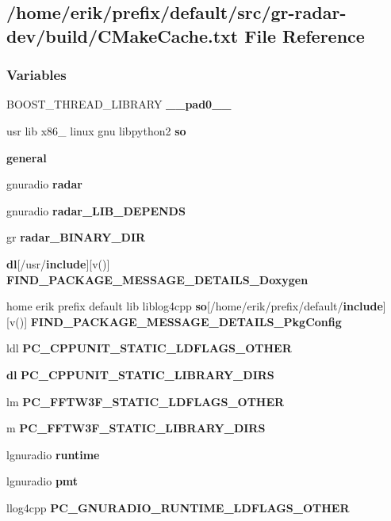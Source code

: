 \subsection{/home/erik/prefix/default/src/gr-\/radar-\/dev/build/\+C\+Make\+Cache.txt File Reference}
\label{gr-radar-dev_2build_2CMakeCache_8txt}
\subsubsection*{Variables}
\begin{DoxyCompactItemize}
\item 
B\+O\+O\+S\+T\+\_\+\+T\+H\+R\+E\+A\+D\+\_\+\+L\+I\+B\+R\+A\+RY {\bf \+\_\+\+\_\+pad0\+\_\+\+\_\+}
\item 
usr lib x86\+\_ linux gnu libpython2 {\bf so}
\item 
{\bf general}
\item 
gnuradio {\bf radar}
\item 
gnuradio {\bf radar\+\_\+\+L\+I\+B\+\_\+\+D\+E\+P\+E\+N\+DS}
\item 
gr {\bf radar\+\_\+\+B\+I\+N\+A\+R\+Y\+\_\+\+D\+IR}
\item 
{\bf dl}[/usr/{\bf include}][v()] {\bf F\+I\+N\+D\+\_\+\+P\+A\+C\+K\+A\+G\+E\+\_\+\+M\+E\+S\+S\+A\+G\+E\+\_\+\+D\+E\+T\+A\+I\+L\+S\+\_\+\+Doxygen}
\item 
home erik prefix default lib liblog4cpp {\bf so}[/home/erik/prefix/default/{\bf include}][v()] {\bf F\+I\+N\+D\+\_\+\+P\+A\+C\+K\+A\+G\+E\+\_\+\+M\+E\+S\+S\+A\+G\+E\+\_\+\+D\+E\+T\+A\+I\+L\+S\+\_\+\+Pkg\+Config}
\item 
ldl {\bf P\+C\+\_\+\+C\+P\+P\+U\+N\+I\+T\+\_\+\+S\+T\+A\+T\+I\+C\+\_\+\+L\+D\+F\+L\+A\+G\+S\+\_\+\+O\+T\+H\+ER}
\item 
{\bf dl} {\bf P\+C\+\_\+\+C\+P\+P\+U\+N\+I\+T\+\_\+\+S\+T\+A\+T\+I\+C\+\_\+\+L\+I\+B\+R\+A\+R\+Y\+\_\+\+D\+I\+RS}
\item 
lm {\bf P\+C\+\_\+\+F\+F\+T\+W3\+F\+\_\+\+S\+T\+A\+T\+I\+C\+\_\+\+L\+D\+F\+L\+A\+G\+S\+\_\+\+O\+T\+H\+ER}
\item 
m {\bf P\+C\+\_\+\+F\+F\+T\+W3\+F\+\_\+\+S\+T\+A\+T\+I\+C\+\_\+\+L\+I\+B\+R\+A\+R\+Y\+\_\+\+D\+I\+RS}
\item 
lgnuradio {\bf runtime}
\item 
lgnuradio {\bf pmt}
\item 
llog4cpp {\bf P\+C\+\_\+\+G\+N\+U\+R\+A\+D\+I\+O\+\_\+\+R\+U\+N\+T\+I\+M\+E\+\_\+\+L\+D\+F\+L\+A\+G\+S\+\_\+\+O\+T\+H\+ER}

\end{DoxyCompactItemize}
